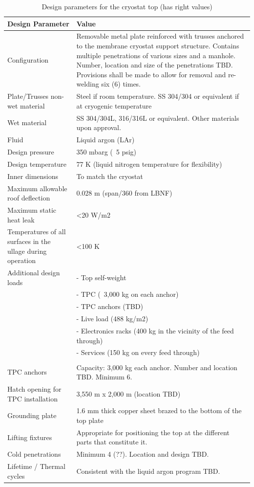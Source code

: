 \begin{table}[htpb]
\caption{Design parameters for the cryostat top (has right values)}
\label{tbl:cryostat-top-parameters}
\centering
\begin{tabular}{|p{}|p{}|}
\hline
 \textbf{Design Parameter} & \textbf{Value} \\ \hline
 Configuration &  Removable metal plate reinforced with trusses anchored to the membrane cryostat support structure. Contains multiple penetrations of various sizes and a manhole. Number, location and size of the penetrations TBD. Provisions shall be made to allow for removal and re-welding six (6) times.\\ \hline
Plate/Trusses non-wet material  &  Steel if room temperature.
SS 304/304 or equivalent if at cryogenic temperature
\\ \hline
Wet material  & SS 304/304L, 316/316L or equivalent. 
Other materials upon approval.
 \\ \hline
 Fluid & Liquid argon (LAr) \\ \hline
Design pressure  & 350 mbarg (~5 psig) \\ \hline
Design temperature  & 77 K (liquid nitrogen temperature for flexibility) \\ \hline
Inner dimensions  & To match the cryostat \\ \hline
Maximum allowable roof deflection  & 0.028 m (span/360 from LBNF) \\ \hline
Maximum static heat leak  & \textless 20 W/m2  \\ \hline
 Temperatures of all surfaces in the ullage during operation & \textless 100 K \\ \hline
Additional design loads  &  -	Top self-weight \\
& -	TPC (~3,000 kg on each anchor)\\
& -	TPC anchors (TBD)\\
& -	Live load (488 kg/m2)\\
& -	Electronics racks (400 kg in the vicinity of the feed through)\\
& -	Services (150 kg on every feed through)\\
\\ \hline
TPC anchors  & Capacity: 3,000 kg each anchor.
Number and location TBD. Minimum 6.
 \\ \hline
 Hatch opening for TPC installation &  3,550 m x 2,000 m (location TBD)\\ \hline
Grounding plate  &  1.6 mm thick copper sheet brazed to the bottom of the top plate\\ \hline
Lifting fixtures  & Appropriate for positioning the top at the different parts that constitute it. \\ \hline
Cold penetrations  & Minimum 4 (??). Location and design TBD. \\ \hline
Lifetime / Thermal cycles  & Consistent with the liquid argon program TBD. \\ \hline
\end{tabular}
\end{table}

